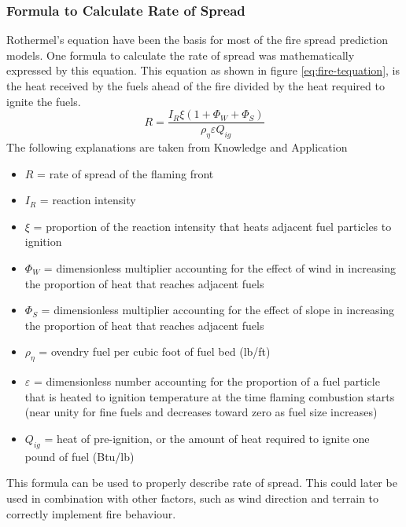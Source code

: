 \subsubsection{Formula to Calculate Rate of Spread}
Rothermel’s equation have been the basis for most of the fire spread prediction models. One formula to calculate the rate of spread was mathematically expressed by this equation. This equation as shown in figure \ref{eq:fire-tequation}, is the heat received by the fuels ahead of the fire divided by the heat required to ignite the fuels\cite{wildfire}.
\begin{equation}
R=\dfrac{I_R \xi(1 + \Phi_W + \Phi_S)}{\rho _{\eta} \varepsilon  Q_{ig}}
\label{eq:fire-tequation}
\end{equation}
The following explanations are taken from Knowledge and Application \cite{rateofspread}
\begin{itemize}
\item $ R $ = rate of spread of the flaming front
\item $I_R$ = reaction intensity
\item $\xi$ = proportion of the reaction intensity that heats adjacent fuel particles to ignition
\item $\Phi_W$ = dimensionless multiplier accounting for the effect of wind in increasing the proportion of heat that reaches adjacent fuels
\item $\Phi_S$ = dimensionless multiplier accounting for the effect of slope in increasing the proportion of heat that reaches adjacent fuels
\item $\rho _{\eta}$ = ovendry fuel per cubic foot of fuel bed (lb/ft)
\item $\varepsilon$ = dimensionless number accounting for the proportion of a fuel particle that is heated to ignition temperature at the time flaming combustion starts (near unity for fine fuels and decreases toward zero as fuel size increases)
\item $Q_{ig}$ = heat of pre-ignition, or the amount of heat required to ignite one pound of fuel (Btu/lb)
\end{itemize}
This formula can be used to properly describe rate of spread. This could later be used in combination with other factors, such as wind direction and terrain to correctly implement fire behaviour.
